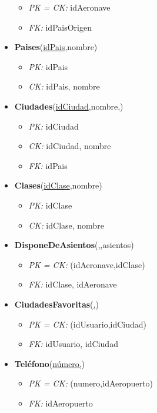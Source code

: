 \begin{itemize}
\begin{itemize}
			\item \textit{PK = CK: } idAeronave
			\item \textit{FK: } idPaisOrigen
		\end{itemize}
	\item \textbf{Paises}(\underline{idPais},nombre)
		\begin{itemize}
			\item \textit{PK: } idPais
			\item \textit{CK: } idPais, nombre
		\end{itemize}
	\item \textbf{Ciudades}(\underline{idCiudad},nombre,)
		\begin{itemize}
			\item \textit{PK: } idCiudad
			\item \textit{CK: } idCiudad, nombre
			\item \textit{FK: } idPais
		\end{itemize}
	\item \textbf{Clases}(\underline{idClase},nombre)
		\begin{itemize}
			\item \textit{PK: } idClase
			\item \textit{CK: } idClase, nombre
		\end{itemize}
	\item \textbf{DisponeDeAsientos}(\underline{,},asientos)
		\begin{itemize}
			\item \textit{PK = CK: } (idAeronave,idClase)
			\item \textit{FK: } idClase, idAeronave	
		\end{itemize}
	\item \textbf{CiudadesFavoritas}(\underline{,})
		\begin{itemize}
			\item \textit{PK = CK: } (idUsuario,idCiudad)
			\item \textit{FK: } idUsuario, idCiudad	
		\end{itemize}
	\item \textbf{Tel\'efono}(\underline{n\'umero,})
		\begin{itemize}
			\item \textit{PK = CK: } (numero,idAeropuerto)
			\item \textit{FK: } idAeropuerto
		\end{itemize}
\end{itemize}	
